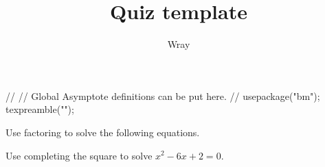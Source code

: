 \documentclass[addpoints, 12pt]{exam}
\title{Quiz template}
\author{Wray}
\begin{document}
\begin{asydef}
//
// Global Asymptote definitions can be put here.
//
usepackage("bm");
texpreamble("\def\V#1{\bm{#1}}");
\end{asydef}



\bigskip

             
\bigskip
\bigskip

\smallskip

\begin{questions}

\question
Use factoring to solve the following equations.
\newpage 

\question[8]
Use completing the square to solve $x^2 - 6x + 2 = 0$.


\end{questions}
\end{document}
